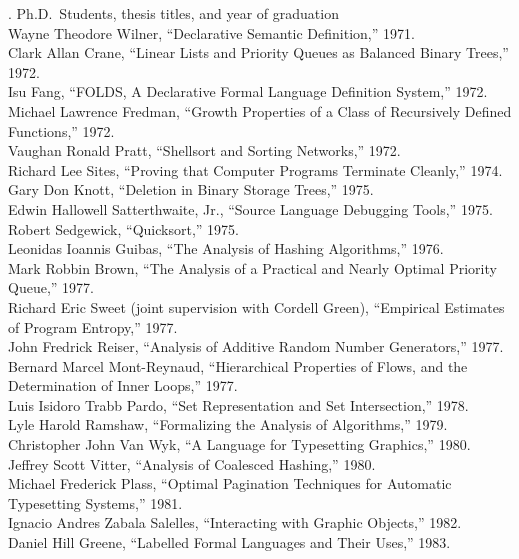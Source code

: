 . {Ph.D.\ Students\rm, thesis titles, and year of graduation}
\\Wayne Theodore Wilner, ``Declarative Semantic Definition,'' 1971.
\\Clark Allan Crane, ``Linear Lists and Priority Queues as
 Balanced Binary Trees,'' 1972.
\\Isu Fang, ``FOLDS, A Declarative Formal Language Definition System,'' 1972.
\\Michael Lawrence Fredman, ``Growth Properties of a Class of
 Recursively Defined Func\-tions,'' 1972.
\\Vaughan Ronald Pratt, ``Shellsort and Sorting Networks,'' 1972.
\\Richard Lee Sites, ``Proving that Computer Programs Terminate
 Cleanly,'' 1974.
\\Gary Don Knott, ``Deletion in Binary Storage Trees,'' 1975.
\\Edwin Hallowell Satterthwaite, Jr., ``Source Language Debugging
 Tools,'' 1975.
\\Robert Sedgewick, ``Quicksort,'' 1975.
\\Leonidas Ioannis Guibas, ``The Analysis of Hashing Algorithms,'' 1976.
\\Mark Robbin Brown, ``The Analysis of a Practical and Nearly Optimal
 Priority Queue,'' 1977.
\\Richard Eric Sweet (joint supervision with Cordell Green), ``Empirical
 Estimates of Program Entropy,'' 1977.
\\John Fredrick Reiser, ``Analysis of Additive Random Number
 Generators,'' 1977.
\\Bernard Marcel Mont-Reynaud, ``Hierarchical Properties of Flows, and the
 Determination of Inner Loops,'' 1977.
\\Luis Isidoro Trabb Pardo, ``Set Representation and Set Intersection,'' 1978.
\\Lyle Harold Ramshaw, ``Formalizing the Analysis of Algorithms,'' 1979.
\\Christopher John Van Wyk, ``A Language for Typesetting Graphics,'' 1980.
\\Jeffrey Scott Vitter, ``Analysis of Coalesced Hashing,'' 1980.
\\Michael Frederick Plass, ``Optimal Pagination Techniques for
 Automatic Typesetting Systems,'' 1981.
\\Ignacio Andres Zabala Salelles, ``Interacting with Graphic Objects,'' 1982.
\\Daniel Hill Greene, ``Labelled Formal Languages and Their Uses,'' 1983.
